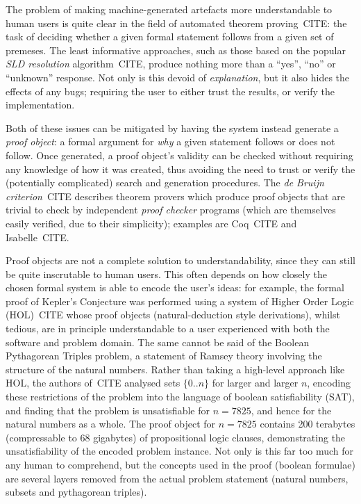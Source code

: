 \documentclass{article}
\begin{document}
The problem of making machine-generated artefacts more understandable to human
users is quite clear in the field of automated theorem proving~CITE: the task of
deciding whether a given formal statement follows from a given set of premeses.
The least informative approaches, such as those based on the popular \emph{SLD
  resolution} algorithm~CITE, produce nothing more than a ``yes'', ``no'' or
``unknown'' response. Not only is this devoid of \emph{explanation}, but it also
hides the effects of any bugs; requiring the user to either trust the results,
or verify the implementation.

Both of these issues can be mitigated by having the system instead generate a
\emph{proof object}: a formal argument for \emph{why} a given statement follows
or does not follow. Once generated, a proof object's validity can be checked
without requiring any knowledge of how it was created, thus avoiding the need to
trust or verify the (potentially complicated) search and generation
procedures. The \emph{de Bruijn criterion}~CITE describes theorem provers which
produce proof objects that are trivial to check by independent \emph{proof
  checker} programs (which are themselves easily verified, due to their
simplicity); examples are Coq~CITE and Isabelle~CITE.

Proof objects are not a complete solution to understandability, since they can
still be quite inscrutable to human users. This often depends on how closely
the chosen formal system is able to encode the user's ideas: for example, the
formal proof of Kepler's Conjecture was performed using a system of Higher Order
Logic (HOL)~CITE whose proof objects (natural-deduction style derivations),
whilst tedious, are in principle understandable to a user experienced with both
the software and problem domain. The same cannot be said of the Boolean
Pythagorean Triples problem, a statement of Ramsey theory involving the
structure of the natural numbers. Rather than taking a high-level approach like
HOL, the authors of~CITE analysed sets $\{0..n\}$ for larger and larger $n$,
encoding these restrictions of the problem into the language of boolean
satisfiability (SAT), and finding that the problem is unsatisfiable for
$n= 7825$, and hence for the natural numbers as a whole. The proof object for
$n = 7825$ contains 200 terabytes (compressable to 68 gigabytes) of
propositional logic clauses, demonstrating the unsatisfiability of the encoded
problem instance. Not only is this far too much for any human to comprehend, but
the concepts used in the proof (boolean formulae) are several layers removed
from the actual problem statement (natural numbers, subsets and pythagorean
triples).
\end{document}
